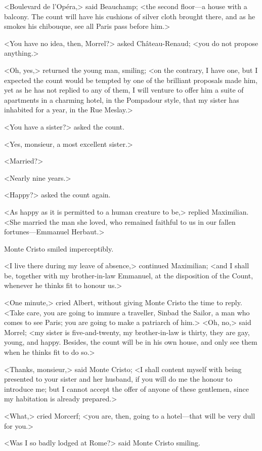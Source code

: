 <Boulevard de l'Opéra,> said Beauchamp; <the second floor—a house with a balcony. The count will have his cushions of silver cloth brought there, and as he smokes his chibouque, see all Paris pass before him.> 

 <You have no idea, then, Morrel?> asked Château-Renaud; <you do not propose anything.> 

 <Oh, yes,> returned the young man, smiling; <on the contrary, I have one, but I expected the count would be tempted by one of the brilliant proposals made him, yet as he has not replied to any of them, I will venture to offer him a suite of apartments in a charming hotel, in the Pompadour style, that my sister has inhabited for a year, in the Rue Meslay.> 

 <You have a sister?> asked the count. 

 <Yes, monsieur, a most excellent sister.> 

 <Married?> 

 <Nearly nine years.> 

 <Happy?> asked the count again. 

 <As happy as it is permitted to a human creature to be,> replied Maximilian. <She married the man she loved, who remained faithful to us in our fallen fortunes—Emmanuel Herbaut.> 

 Monte Cristo smiled imperceptibly. 

 <I live there during my leave of absence,> continued Maximilian; <and I shall be, together with my brother-in-law Emmanuel, at the disposition of the Count, whenever he thinks fit to honour us.> 

 <One minute,> cried Albert, without giving Monte Cristo the time to reply. <Take care, you are going to immure a traveller, Sinbad the Sailor, a man who comes to see Paris; you are going to make a patriarch of him.>  <Oh, no,> said Morrel; <my sister is five-and-twenty, my brother-in-law is thirty, they are gay, young, and happy. Besides, the count will be in his own house, and only see them when he thinks fit to do so.> 

 <Thanks, monsieur,> said Monte Cristo; <I shall content myself with being presented to your sister and her husband, if you will do me the honour to introduce me; but I cannot accept the offer of anyone of these gentlemen, since my habitation is already prepared.> 

 <What,> cried Morcerf; <you are, then, going to a hotel—that will be very dull for you.> 

 <Was I so badly lodged at Rome?> said Monte Cristo smiling. 

